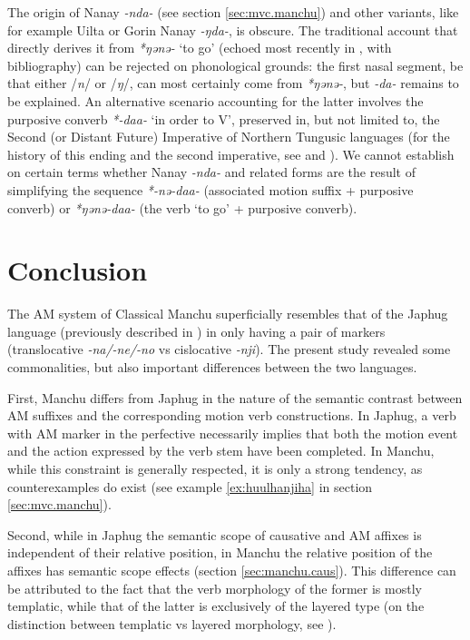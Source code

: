 \documentclass{article}
\newcommand{\ipa}[1]{\textit{{\phon\mbox{#1}}}} %
\begin{document}
The origin of Nanay \ipa{-nda-} (see section \ref{sec:mvc.manchu}) and other variants, like for example Uilta or Gorin Nanay \ipa{-ŋda-}, is obscure. The traditional account that directly derives it from \ipa{*ŋǝnǝ-} ‘to go’ (echoed most recently in \citealt[93-94]{stojnova16nda}, with bibliography) can be rejected on phonological grounds: the first nasal segment, be that either /\ipa{n}/ or /\ipa{ŋ}/, can most certainly come from \ipa{*ŋǝnǝ-}, but \ipa{-da-} remains to be explained. An alternative scenario accounting for the latter involves the purposive converb \ipa{*-daa-} ‘in order to V’, preserved in, but not limited to, the Second (or Distant Future) Imperative of Northern Tungusic languages (for the history of this ending and the second imperative, see \citealt[135-136,§141]{benzing56tungusischen} and \citealt[54-70]{xasanova86povelitelnoe}). We cannot establish on certain terms whether Nanay \ipa{-nda-} and related forms are the result of simplifying the sequence \ipa{*-nǝ-daa-} (associated motion suffix + purposive converb) or \ipa{*ŋǝnǝ-daa-} (the verb `to go' + purposive converb).

\section*{Conclusion}
The AM system of Classical Manchu superficially resembles that of the Japhug language (previously described in \citealt{jacques13harmonization}) in only having a pair of markers (translocative \ipa{-na/-ne/-no} vs cislocative \ipa{-nji}). The present study revealed some commonalities, but also important differences between the two languages. 

First, Manchu differs from Japhug in the nature of the semantic contrast between AM suffixes and the corresponding motion verb constructions. In Japhug, a verb with AM marker in the perfective necessarily implies that both the motion event and the action expressed by the verb stem have been completed. In Manchu, while this constraint is generally respected, it is only a strong tendency, as counterexamples do exist (see example \ref{ex:huulhanjiha} in section \ref{sec:mvc.manchu}).

Second, while in Japhug the semantic scope of causative and AM affixes is independent of their relative position, in Manchu the relative position of the affixes has semantic scope effects (section \ref{sec:manchu.caus}). This difference can be attributed to the fact that the verb morphology of the former is mostly templatic, while that of the latter is exclusively of the layered type (on the distinction between templatic vs layered morphology, see \citealt{bickel07inflectional}).
\end{document}
